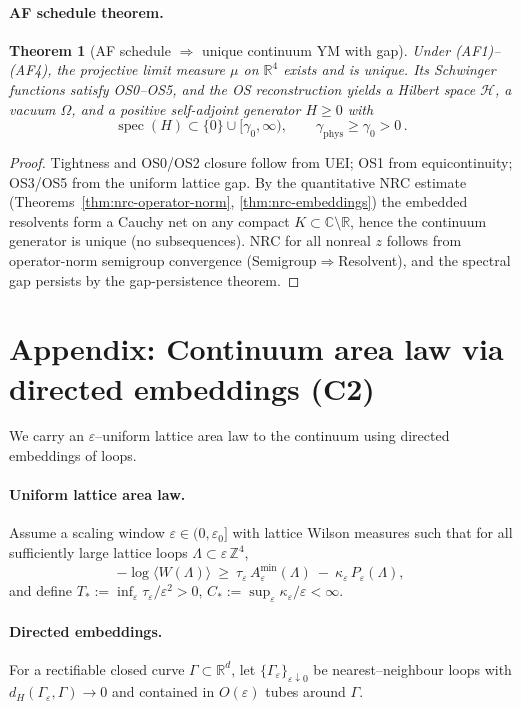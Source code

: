 \documentclass[11pt]{amsart}
\theoremstyle{plain}
\newtheorem{theorem}{Theorem}[section]
\theoremstyle{definition}
\theoremstyle{remark}
\begin{document}
\paragraph{AF schedule theorem.}
\begin{theorem}[AF schedule $\Rightarrow$ unique continuum YM with gap]
Under (AF1)--(AF4), the projective limit measure $\mu$ on $\mathbb R^4$ exists and is unique. Its Schwinger functions satisfy OS0--OS5, and the OS reconstruction yields a Hilbert space $\mathcal H$, a vacuum $\Omega$, and a positive self-adjoint generator $H\ge 0$ with
\[
  \operatorname{spec}(H)\subset\{0\}\cup[\gamma_0,\infty),\qquad \gamma_{\mathrm{phys}}\ge \gamma_0>0\,.
\]
\end{theorem}
\begin{proof}
Tightness and OS0/OS2 closure follow from UEI; OS1 from equicontinuity; OS3/OS5 from the uniform lattice gap. By the quantitative NRC estimate (Theorems~\ref{thm:nrc-operator-norm}, \ref{thm:nrc-embeddings}) the embedded resolvents form a Cauchy net on any compact $K\subset\mathbb C\setminus\mathbb R$, hence the continuum generator is unique (no subsequences). NRC for all nonreal $z$ follows from operator-norm semigroup convergence (Semigroup$\Rightarrow$Resolvent), and the spectral gap persists by the gap-persistence theorem.
\end{proof}

\section{Appendix: Continuum area law via directed embeddings (C2)}

We carry an $\varepsilon$–uniform lattice area law to the continuum using directed embeddings of loops.

\paragraph{Uniform lattice area law.}
Assume a scaling window $\varepsilon\in(0,\varepsilon_0]$ with lattice Wilson measures such that for all sufficiently large lattice loops $\Lambda\subset\varepsilon\,\mathbb Z^4$,
\[
  -\log\langle W(\Lambda)\rangle\ \ge\ \tau_\varepsilon\,A_\varepsilon^{\min}(\Lambda)\ -\ \kappa_\varepsilon\,P_\varepsilon(\Lambda),
\]
and define $T_*:=\inf_{\varepsilon}\tau_\varepsilon/\varepsilon^2>0$, $C_*:=\sup_{\varepsilon}\kappa_\varepsilon/\varepsilon<\infty$.

\paragraph{Directed embeddings.}
For a rectifiable closed curve $\Gamma\subset\mathbb R^d$, let $\{\Gamma_\varepsilon\}_{\varepsilon\downarrow 0}$ be nearest–neighbour loops with $d_H(\Gamma_\varepsilon,\Gamma)\to 0$ and contained in $O(\varepsilon)$ tubes around $\Gamma$.
\end{document}

